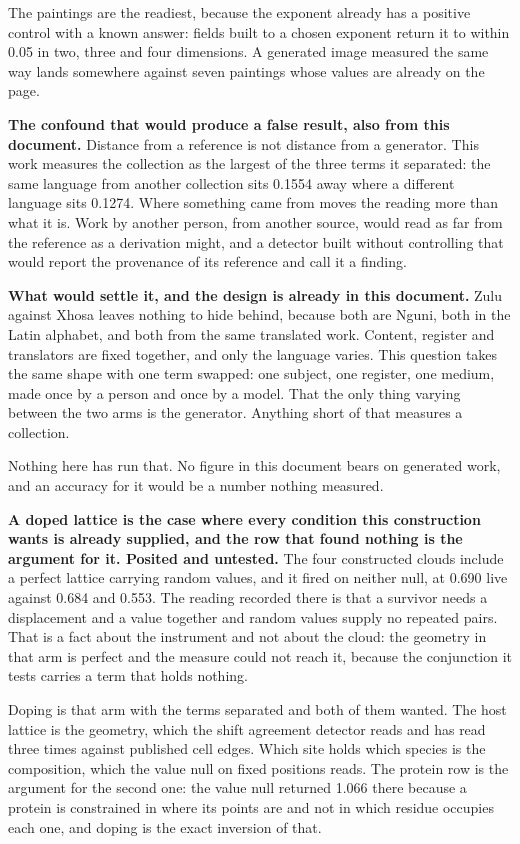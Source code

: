 The paintings are the readiest, because the exponent already has a positive control with a known answer: fields built to a chosen exponent return it to within 0.05 in two, three and four dimensions. A generated image measured the same way lands somewhere against seven paintings whose values are already on the page.

\textbf{The confound that would produce a false result, also from this document.} Distance from a reference is not distance from a generator. This work measures the collection as the largest of the three terms it separated: the same language from another collection sits 0.1554 away where a different language sits 0.1274. Where something came from moves the reading more than what it is. Work by another person, from another source, would read as far from the reference as a derivation might, and a detector built without controlling that would report the provenance of its reference and call it a finding.

\textbf{What would settle it, and the design is already in this document.} Zulu against Xhosa leaves nothing to hide behind, because both are Nguni, both in the Latin alphabet, and both from the same translated work. Content, register and translators are fixed together, and only the language varies. This question takes the same shape with one term swapped: one subject, one register, one medium, made once by a person and once by a model. That the only thing varying between the two arms is the generator. Anything short of that measures a collection.

Nothing here has run that. No figure in this document bears on generated work, and an accuracy for it would be a number nothing measured.

\textbf{A doped lattice is the case where every condition this construction wants is already supplied, and the row that found nothing is the argument for it. Posited and untested.} The four constructed clouds include a perfect lattice carrying random values, and it fired on neither null, at 0.690 live against 0.684 and 0.553. The reading recorded there is that a survivor needs a displacement and a value together and random values supply no repeated pairs. That is a fact about the instrument and not about the cloud: the geometry in that arm is perfect and the measure could not reach it, because the conjunction it tests carries a term that holds nothing.

Doping is that arm with the terms separated and both of them wanted. The host lattice is the geometry, which the shift agreement detector reads and has read three times against published cell edges. Which site holds which species is the composition, which the value null on fixed positions reads. The protein row is the argument for the second one: the value null returned 1.066 there because a protein is constrained in where its points are and not in which residue occupies each one, and doping is the exact inversion of that.

